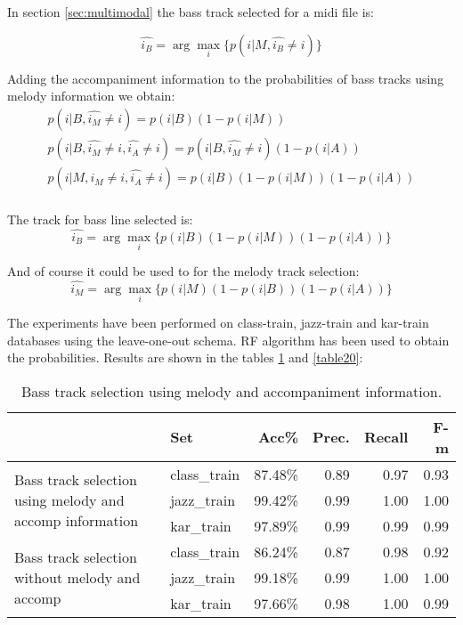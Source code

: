\documentclass{article}
\begin{document}
In section \ref{sec:multimodal} the bass track selected for a midi file is:

\begin{equation}
\hat{i_B}  = \arg \max_i \{p(i|M, \hat{i_B}\neq i)\}    
\end{equation}

Adding the accompaniment information to the probabilities of bass tracks using melody information we obtain:
\begin{equation}
    \begin{matrix}
    p(i|B, \hat{i_M}\neq i) = p(i|B)(1-p(i|M)) \\
    p(i|B, \hat{i_M}\neq i, \hat{i_A}\neq i) = p(i|B, \hat{i_M}\neq i)(1-p(i|A)) \\
    p(i|M, \hat{i_M}\neq i, \hat{i_A}\neq i) = p(i|B)(1-p(i|M))(1-p(i|A)) \\
    \end{matrix}
\end{equation}

The track for bass line selected is:
\begin{equation}
\hat{i_B}  = \arg \max_i \{p(i|B)(1-p(i|M))(1-p(i|A)) \}    
\end{equation}

And of course it could be used to for the melody track selection:
\begin{equation}
\hat{i_M}  = \arg \max_i \{p(i|M)(1-p(i|B))(1-p(i|A)) \}    
\end{equation}

The experiments have been performed on class-train, jazz-train and kar-train databases using the leave-one-out schema. RF algorithm has been used to obtain the probabilities. Results are shown in the  tables \ref{table19} and \ref{table20}:


\begin{table}
\small
\begin{center}
\begin{tabular}{  l | l | r | r | r | r }
\hline
 & Set & Acc\% & Prec. & Recall & F-m \\
\hline
\multirow{3}{3.5cm}{Bass track selection using melody and accomp information} & class\_train & 87.48\% & 0.89 & 0.97 & 0.93 \\
 & jazz\_train & 99.42\% & 0.99 & 1.00 & 1.00 \\
 & kar\_train & 97.89\% & 0.99 & 0.99 & 0.99 \\
\hline
\multirow{3}{3.5cm}{Bass track selection without melody and accomp} & class\_train & 86.24\% & 0.87 & 0.98 & 0.92 \\
 & jazz\_train & 99.18\% & 0.99 & 1.00 & 1.00 \\
 & kar\_train & 97.66\% & 0.98 & 1.00 & 0.99 \\
\hline
\end{tabular}
\caption{Bass track selection using melody and accompaniment information.}
\label{table19}
\end{center}
\end{table}
\end{document}
